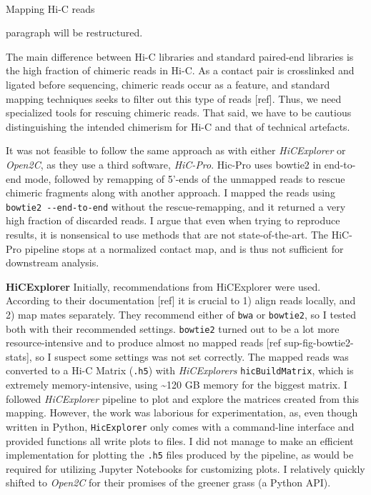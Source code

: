 \documentclass[
  11pt,
  a4paper,
]{scrbook}
\makeatletter
\let\oldparagraph\paragraph
\renewcommand{\paragraph}{
    \@ifstar
      \xxxParagraphStar
      \xxxParagraphNoStar
  }
\newcommand{\xxxParagraphStar}[1]{\oldparagraph*{#1}\mbox{}}
\newcommand{\xxxParagraphNoStar}[1]{\oldparagraph{#1}\mbox{}}
\let\oldemph\emph
\renewcommand\emph[1]{\oldemph{\color{gray}#1}}
\makeatother
\begin{document}
\paragraph{Mapping Hi-C reads}\label{mapping-hi-c-reads}

paragraph will be restructured.

The main difference between Hi-C libraries and standard paired-end
libraries is the high fraction of chimeric reads in Hi-C. As a contact
pair is crosslinked and ligated before sequencing, chimeric reads occur
as a feature, and standard mapping techniques seeks to filter out this
type of reads {[}ref{]}. Thus, we need specialized tools for rescuing
chimeric reads. That said, we have to be cautious distinguishing the
intended chimerism for Hi-C and that of technical artefacts.

It was not feasible to follow the same approach as
\citep{wang_reprogramming_2019} with either \emph{HiCExplorer} or
\emph{Open2C}, as they use a third software, \emph{HiC-Pro}. Hic-Pro
uses bowtie2 in end-to-end mode, followed by remapping of 5'-ends of the
unmapped reads to rescue chimeric fragments along with another approach.
I mapped the reads using \texttt{bowtie2\ -\/-end-to-end} without the
rescue-remapping, and it returned a very high fraction of discarded
reads. I argue that even when trying to reproduce results, it is
nonsensical to use methods that are not state-of-the-art. The HiC-Pro
pipeline stops at a normalized contact map, and is thus not sufficient
for downstream analysis.

\textbf{HiCExplorer} Initially, recommendations from HiCExplorer were
used. According to their documentation {[}ref{]} it is crucial to 1)
align reads locally, and 2) map mates separately. They recommend either
of \texttt{bwa} or \texttt{bowtie2}, so I tested both with their
recommended settings. \texttt{bowtie2} turned out to be a lot more
resource-intensive and to produce almost no mapped reads {[}ref
sup-fig-bowtie2-stats{]}, so I suspect some settings was not set
correctly. The mapped reads was converted to a Hi-C Matrix
(\texttt{.h5}) with \emph{HiCExplorers} \texttt{hicBuildMatrix}, which
is extremely memory-intensive, using \textasciitilde120 GB memory for
the biggest matrix. I followed \emph{HiCExplorer} pipeline to plot and
explore the matrices created from this mapping. However, the work was
laborious for experimentation, as, even though written in Python,
\texttt{HicExplorer} only comes with a command-line interface and
provided functions all write plots to files. I did not manage to make an
efficient implementation for plotting the \texttt{.h5} files produced by
the pipeline, as would be required for utilizing Jupyter Notebooks for
customizing plots. I relatively quickly shifted to \emph{Open2C} for
their promises of the greener grass (a Python API).
\end{document}

